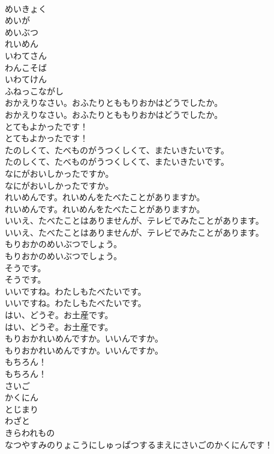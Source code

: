 \documentclass[8pt]{extreport}
\begin{document}
\begin{CJK}{UTF8}{min}
\\	めいきょく
\\	めいが
\\	めいぶつ
\\	れいめん
\\	いわてさん
\\	わんこそば
\\	いわてけん
\\	ふねっこながし
\\	おかえりなさい。おふたりとももりおかはどうでしたか。	
\\	おかえりなさい。おふたりとももりおかはどうでしたか。 
\\	とてもよかったです！	
\\	とてもよかったです！ 
\\	たのしくて、たべものがうつくしくて、またいきたいです。	
\\	たのしくて、たべものがうつくしくて、またいきたいです。 
\\	なにがおいしかったですか。	
\\	なにがおいしかったですか。 
\\	れいめんです。れいめんをたべたことがありますか。	
\\	れいめんです。れいめんをたべたことがありますか。 
\\	いいえ、たべたことはありませんが、テレビでみたことがあります。	
\\	いいえ、たべたことはありませんが、テレビでみたことがあります。 
\\	もりおかのめいぶつでしょう。	
\\	もりおかのめいぶつでしょう。 
\\	そうです。	
\\	そうです。 
\\	いいですね。わたしもたべたいです。	
\\	いいですね。わたしもたべたいです。 
\\	はい、どうぞ。お土産です。	
\\	はい、どうぞ。お土産です。 
\\	もりおかれいめんですか。いいんですか。	
\\	もりおかれいめんですか。いいんですか。 
\\	もちろん！	
\\	もちろん！ 
\\	さいご
\\	かくにん
\\	とじまり
\\	わざと
\\	きらわれもの
\\	なつやすみのりょこうにしゅっぱつするまえにさいごのかくにんです！	

\end{CJK}
\end{document}
